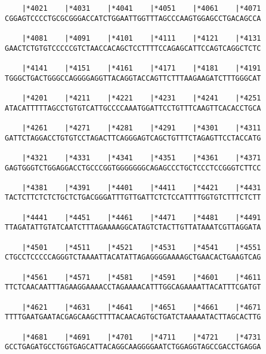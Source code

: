 \documentclass{article}
\begin{document}
\begin{Verbatim}
    |*4021    |*4031    |*4041    |*4051    |*4061    |*4071
CGGAGTCCCCTGCGCGGGACCATCTGGAATTGGTTTAGCCCAAGTGGAGCCTGACAGCCA
                                                            
    |*4081    |*4091    |*4101    |*4111    |*4121    |*4131
GAACTCTGTGTCCCCCGTCTAACCACAGCTCCTTTTCCAGAGCATTCCAGTCAGGCTCTC
                                                            
    |*4141    |*4151    |*4161    |*4171    |*4181    |*4191
TGGGCTGACTGGGCCAGGGGAGGTTACAGGTACCAGTTCTTTAAGAAGATCTTTGGGCAT
                                                            
    |*4201    |*4211    |*4221    |*4231    |*4241    |*4251
ATACATTTTTAGCCTGTGTCATTGCCCCAAATGGATTCCTGTTTCAAGTTCACACCTGCA
                                                            
    |*4261    |*4271    |*4281    |*4291    |*4301    |*4311
GATTCTAGGACCTGTGTCCTAGACTTCAGGGAGTCAGCTGTTTCTAGAGTTCCTACCATG
                                                            
    |*4321    |*4331    |*4341    |*4351    |*4361    |*4371
GAGTGGGTCTGGAGGACCTGCCCGGTGGGGGGGCAGAGCCCTGCTCCCTCCGGGTCTTCC
                                                            
    |*4381    |*4391    |*4401    |*4411    |*4421    |*4431
TACTCTTCTCTCTGCTCTGACGGGATTTGTTGATTCTCTCCATTTTGGTGTCTTTCTCTT
                                                            
    |*4441    |*4451    |*4461    |*4471    |*4481    |*4491
TTAGATATTGTATCAATCTTTAGAAAAGGCATAGTCTACTTGTTATAAATCGTTAGGATA
                                                            
    |*4501    |*4511    |*4521    |*4531    |*4541    |*4551
CTGCCTCCCCCAGGGTCTAAAATTACATATTAGAGGGGAAAAGCTGAACACTGAAGTCAG
                                                            
    |*4561    |*4571    |*4581    |*4591    |*4601    |*4611
TTCTCAACAATTTAGAAGGAAAACCTAGAAAACATTTGGCAGAAAATTACATTTCGATGT
                                                            
    |*4621    |*4631    |*4641    |*4651    |*4661    |*4671
TTTTGAATGAATACGAGCAAGCTTTTACAACAGTGCTGATCTAAAAATACTTAGCACTTG
                                                            
    |*4681    |*4691    |*4701    |*4711    |*4721    |*4731
GCCTGAGATGCCTGGTGAGCATTACAGGCAAGGGGAATCTGGAGGTAGCCGACCTGAGGA
                                                            

\end{Verbatim}
\end{document}
